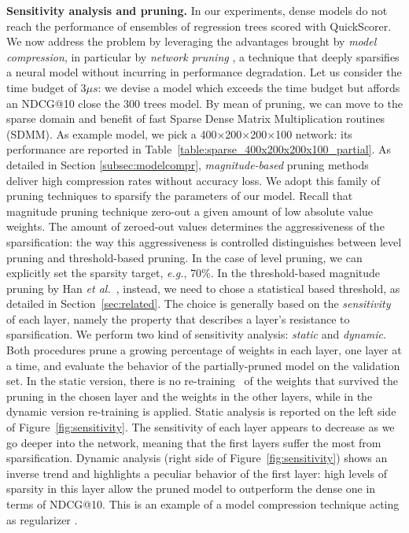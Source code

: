 \smallskip
\noindent \textbf{Sensitivity analysis and pruning.}
In our experiments, dense models do not reach the performance of ensembles of regression trees scored with QuickScorer. We now address the problem by leveraging the advantages brought by \emph{model compression}, in particular by \emph{network pruning} \cite{DBLP:journals/corr/HanPTD15,DBLP:journals/corr/GuoYC16}, a technique that deeply sparsifies a neural model without incurring in performance degradation. Let us consider the time budget of $3 \mu s $:
we devise a model which exceeds the time budget but affords an NDCG@10 close the $300$ trees model. By mean of pruning, we can move to the sparse domain and benefit of fast Sparse Dense Matrix Multiplication routines (SDMM). As example model, we pick a 400$\times$200$\times$200$\times$100 network: its performance are reported in Table~\ref{table:sparse_400x200x200x100_partial}.
As detailed in Section \ref{subsec:modelcompr}, \textit{magnitude-based} pruning methods deliver high compression rates without accuracy loss. We adopt this family of pruning techniques to sparsify the parameters of our model. Recall that magnitude pruning technique zero-out a given amount of low absolute value weights. The amount of zeroed-out values determines the aggressiveness of the sparsification: the way this aggressiveness is controlled distinguishes between level pruning and threshold-based pruning.
In the case of level pruning, we can explicitly set the sparsity target, \emph{e.g.}, 70\%.
%
%
In the threshold-based magnitude pruning by Han \textit{et al.}~\cite{DBLP:journals/corr/HanPTD15}, instead, we need to chose a statistical based threshold, as detailed in Section~\ref{sec:related}. The choice is generally based on the \textit{sensitivity} of each layer, namely  the property that describes a layer's resistance to sparsification.
We perform two kind of sensitivity analysis: \textit{static} and \textit{dynamic}. Both procedures prune a growing percentage of weights in each layer, one layer at a time, and evaluate the behavior of the partially-pruned model on the validation set. In the static version, there is no re-training~\cite{DBLP:journals/corr/HanPTD15} of the weights that survived the pruning in the chosen layer and the weights in the other layers, while in the dynamic version re-training is applied.
Static analysis is reported on the left side of Figure~\ref{fig:sensitivity}. The sensitivity of each layer appears to decrease as we go deeper into the network, meaning that the first layers suffer the most from sparsification. Dynamic analysis (right side of Figure~\ref{fig:sensitivity}) shows an inverse trend and highlights a peculiar behavior of the first layer: high levels of sparsity in this layer allow the pruned model to outperform the dense one in terms of NDCG@10.  This is an example of a model compression technique acting as regularizer \cite{DBLP:journals/corr/HanPTD15,DBLP:journals/corr/ZhouYGXC17}.
